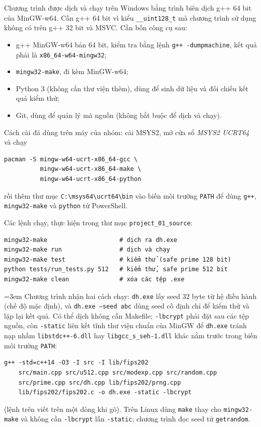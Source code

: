 Chương trình được dịch và chạy trên Windows bằng trình biên dịch g++ 64 bit của
MinGW-w64. Cần g++ 64 bit vì kiểu \texttt{\_\_uint128\_t} mà chương trình sử dụng không
có trên g++ 32 bit và MSVC. Cần bốn công cụ sau:
\begin{itemize}
  \item g++ MinGW-w64 bản 64 bit, kiểm tra bằng lệnh \texttt{g++ -dumpmachine},
        kết quả phải là \texttt{x86\_64-w64-mingw32};
  \item \texttt{mingw32-make}, đi kèm MinGW-w64;
  \item Python 3 (không cần thư viện thêm), dùng để sinh dữ liệu và đối chiếu kết
        quả kiểm thử;
  \item Git, dùng để quản lý mã nguồn (không bắt buộc để dịch và chạy).
\end{itemize}

Cách cài đã dùng trên máy của nhóm: cài MSYS2, mở cửa sổ \emph{MSYS2 UCRT64} và
chạy
\begin{verbatim}
pacman -S mingw-w64-ucrt-x86_64-gcc \
          mingw-w64-ucrt-x86_64-make \
          mingw-w64-ucrt-x86_64-python
\end{verbatim}
rồi thêm thư mục \texttt{C:\textbackslash msys64\textbackslash ucrt64\textbackslash bin}
vào biến môi trường \texttt{PATH} để dùng \texttt{g++}, \texttt{mingw32-make} và
\texttt{python} từ PowerShell.

Các lệnh chạy, thực hiện trong thư mục \texttt{project\_01\_source}:
\begin{verbatim}
mingw32-make                    # dịch ra dh.exe
mingw32-make run                # dịch và chạy
mingw32-make test               # kiểm thử (safe prime 128 bit)
python tests/run_tests.py 512   # kiểm thử, safe prime 512 bit
mingw32-make clean              # xóa các tệp .exe
\end{verbatim}
{\emergencystretch=3em Chương trình nhận hai cách chạy: \texttt{dh.exe} lấy seed 32 byte từ hệ điều hành
(chế độ mặc định), và \texttt{dh.exe --seed abc} dùng seed cố định chỉ để kiểm
thử và lặp lại kết quả. Có thể dịch không cần Makefile; \texttt{-lbcrypt} phải đặt sau các tệp nguồn, còn \texttt{-static} liên kết tĩnh thư viện chuẩn của MinGW để \texttt{dh.exe} tránh nạp nhầm \texttt{libstdc++\allowbreak -6.dll} hay \texttt{libgcc\_\allowbreak s\_\allowbreak seh-1.dll} khác nằm trước trong biến môi trường \texttt{PATH}:\par}
\begin{verbatim}
g++ -std=c++14 -O3 -I src -I lib/fips202
    src/main.cpp src/u512.cpp src/modexp.cpp src/random.cpp
    src/prime.cpp src/dh.cpp lib/fips202/prng.cpp
    lib/fips202/fips202.c -o dh.exe -static -lbcrypt
\end{verbatim}
(lệnh trên viết trên một dòng khi gõ). Trên Linux dùng \texttt{make} thay cho
\texttt{mingw32-make} và không cần \texttt{-lbcrypt} lẫn \texttt{-static}; chương trình đọc seed từ
\texttt{getrandom}.

